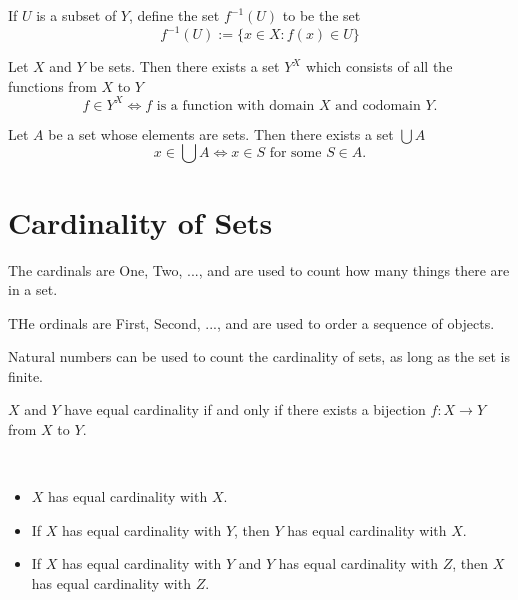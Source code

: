 \documentclass{blog}
\begin{document}
\begin{definition}
  If $U$ is a subset of $Y$, define the set $f^{-1}(U)$ to be the set
  \begin{equation}
    f^{-1}(U) := \{x \in X : f(x) \in U\}
  \end{equation}
\end{definition}

\begin{axiom}
  Let $X$ and $Y$ be sets. Then there exists a set $Y^{X}$
  which consists of all the functions from $X$ to $Y$
  \begin{equation}
    f \in Y^{X} \Longleftrightarrow \text{$f$ is a function with domain $X$ and codomain $Y$.}
  \end{equation}
\end{axiom}

\begin{axiom}[union]
  Let $A$ be a set whose elements are sets.
  Then there exists a set $\bigcup A$
  \begin{equation}
    x \in \bigcup A \Longleftrightarrow \text{$x \in S$ for some $S \in A$.}
  \end{equation}
\end{axiom}

\section{Cardinality of Sets}
\begin{definition}
  The cardinals are One, Two, ..., and are used to count how many things there are in a set.

  THe ordinals are First, Second, ..., and are used to order a sequence of objects.
\end{definition}

Natural numbers can be used to count the cardinality of sets, as long as the set is finite.

\begin{definition}
  $X$ and $Y$ have equal cardinality if and only if there exists a bijection $f: X \to Y$ from $X$ to $Y$.
\end{definition}

\begin{proposition}~
  \begin{itemize}
  \item $X$ has equal cardinality with $X$.
  \item If $X$ has equal cardinality with $Y$, then $Y$ has equal cardinality with $X$.
  \item If $X$ has equal cardinality with $Y$ and $Y$ has equal cardinality with $Z$,
    then $X$ has equal cardinality with $Z$.
  \end{itemize}
\end{proposition}
\end{document}
